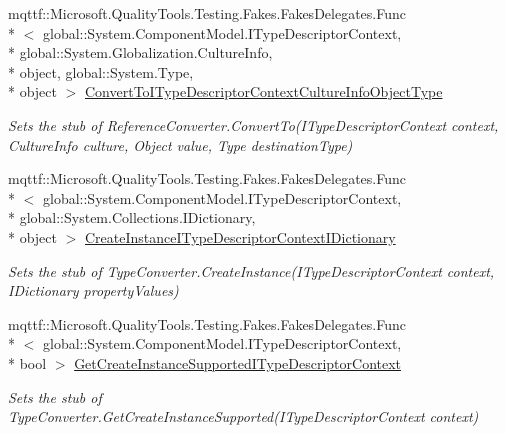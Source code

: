 \begin{DoxyCompactItemize}
mqttf\-::\-Microsoft.\-Quality\-Tools.\-Testing.\-Fakes.\-Fakes\-Delegates.\-Func\\*
$<$ global\-::\-System.\-Component\-Model.\-I\-Type\-Descriptor\-Context, \\*
global\-::\-System.\-Globalization.\-Culture\-Info, \\*
object, global\-::\-System.\-Type, \\*
object $>$ \hyperlink{class_system_1_1_component_model_1_1_fakes_1_1_stub_reference_converter_aeba5b6d39f29eef558df145f236f1a1b}{Convert\-To\-I\-Type\-Descriptor\-Context\-Culture\-Info\-Object\-Type}
\begin{DoxyCompactList}\small\item\em Sets the stub of Reference\-Converter.\-Convert\-To(\-I\-Type\-Descriptor\-Context context, Culture\-Info culture, Object value, Type destination\-Type)\end{DoxyCompactList}\item 
mqttf\-::\-Microsoft.\-Quality\-Tools.\-Testing.\-Fakes.\-Fakes\-Delegates.\-Func\\*
$<$ global\-::\-System.\-Component\-Model.\-I\-Type\-Descriptor\-Context, \\*
global\-::\-System.\-Collections.\-I\-Dictionary, \\*
object $>$ \hyperlink{class_system_1_1_component_model_1_1_fakes_1_1_stub_reference_converter_a0d8cf11c4ef87f37a96b696c08427702}{Create\-Instance\-I\-Type\-Descriptor\-Context\-I\-Dictionary}
\begin{DoxyCompactList}\small\item\em Sets the stub of Type\-Converter.\-Create\-Instance(\-I\-Type\-Descriptor\-Context context, I\-Dictionary property\-Values)\end{DoxyCompactList}\item 
mqttf\-::\-Microsoft.\-Quality\-Tools.\-Testing.\-Fakes.\-Fakes\-Delegates.\-Func\\*
$<$ global\-::\-System.\-Component\-Model.\-I\-Type\-Descriptor\-Context, \\*
bool $>$ \hyperlink{class_system_1_1_component_model_1_1_fakes_1_1_stub_reference_converter_a24b122daa759d3159f2ac27facfac4f9}{Get\-Create\-Instance\-Supported\-I\-Type\-Descriptor\-Context}
\begin{DoxyCompactList}\small\item\em Sets the stub of Type\-Converter.\-Get\-Create\-Instance\-Supported(\-I\-Type\-Descriptor\-Context context)\end{DoxyCompactList}\item 

\end{DoxyCompactItemize}
